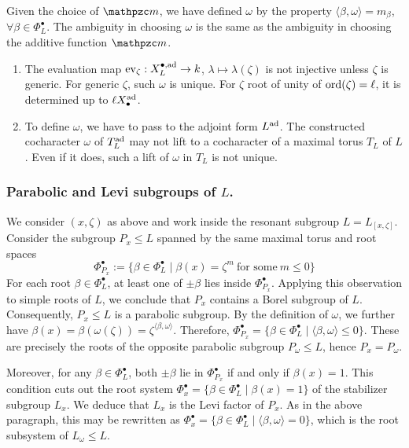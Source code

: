 \begin{remark}\label{remark: non-uniqueness of the resonant part}
Given the choice of $\mm$, we have defined $\omega$ by the property $\langle \beta, \omega \rangle = m_{\beta}$, $\forall \beta \in \Phi^{\bullet}_L$. The ambiguity in choosing $\omega$ is the same as the ambiguity in choosing the additive function $\mm$.
\begin{enumerate}
    \item The evaluation map $\operatorname{ev}_{\zeta}: X^{\bullet, \operatorname{ad}}_{L} \to k$, $\lambda \mapsto \lambda(\zeta)$ is not injective unless $\zeta$ is generic. For generic $\zeta$, such $\omega$ is unique. For $\zeta$ root of unity of $\mathrm{ord}(\zeta) = \ell$, it is determined up to $\ell X_{\bullet}^{{\operatorname{ad}}}$.
    \item To define $\omega$, we have to pass to the adjoint form $L^{\operatorname{ad}}$. The constructed cocharacter $\omega$ of $T^{\operatorname{ad}}_{L}$ may not lift to a cocharacter of a maximal torus $T_L$ of $L$. Even if it does, such a lift of $\omega$ in $T_L$ is not unique.
\end{enumerate}
\end{remark}



\subsubsection{Parabolic and Levi subgroups of $L$.}\label{section: parabolic and levi subgrops of L}
We consider $(x, \zeta)$ as above and work inside the resonant subgroup $L=L_{[x, \zeta]}$.
%
Consider the subgroup $P_x \leq L$ spanned by the same maximal torus and root spaces 
\begin{equation}\label{equation: roots of Px}
 \Phi^{\bullet}_{P_x} := \{\beta \in \Phi^{\bullet}_L \mid \beta(x) = \zeta^m \ \text{for some} \ m \leq 0 \}
\end{equation}
For each root $\beta \in \Phi^{\bullet}_L$, at least one of $\pm \beta$ lies inside $\Phi^{\bullet}_{P_x}$. Applying this observation to simple roots of $L$, we conclude that $P_x$ contains a Borel subgroup of $L$. Consequently, $P_x \leq L$ is a parabolic subgroup.
%
By the definition of $\omega$, we further have $\beta(x) = \beta(\omega(\zeta)) = \zeta^{\langle \beta, \omega \rangle}$. Therefore, $\Phi^{\bullet}_{P_x} = \{\beta \in \Phi^{\bullet}_L \mid \langle \beta, \omega \rangle \leq 0 \}$. These are precisely the roots of the opposite parabolic subgroup $P_{\omega} \leq L$, hence $P_x = P_{\omega}$.


Moreover, for any $\beta \in \Phi^{\bullet}_L$, both $\pm \beta$ lie in $\Phi^{\bullet}_{P_x}$ if and only if $\beta(x) = 1$. This condition cuts out the root system $ \Phi^{\bullet}_{x} = \{\beta \in \Phi^{\bullet}_L \mid \beta(x) = 1 \}$ of the stabilizer subgroup $L_x$. We deduce that $L_x$ is the Levi factor of $P_x$. As in the above paragraph, this may be rewritten as $\Phi^{\bullet}_{x} = \{\beta \in \Phi^{\bullet}_L \mid \langle \beta, \omega \rangle = 0 \}$, which is the root subsystem of $L_{\omega} \leq L$.

